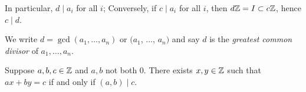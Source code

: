 \documentclass[a4paper, 10pt]{amsart}
\begin{document}
In particular, $d \mid a_i$ for all $i$; Conversely, if $c \mid a_i$ for all $i$, then $d \mathbb{Z} = I \subset c \mathbb{Z}$, hence $c \mid d$.

\begin{definition}
  We write $d = \gcd(a_1, \dots, a_n)$ or $(a_1$, $\dots$, $a_n)$ and say $d$ is the \emph{greatest common divisor} of $a_1, \dots, a_n$.
\end{definition}

\begin{corollary}[Bézout]
  Suppose $a, b, c \in \mathbb{Z}$ and $a, b$ not both 0. There exists $x, y \in \mathbb{Z}$ such that $ax + by = c$ if and only if $(a, b) \mid c$.
\end{corollary}



\end{document}
